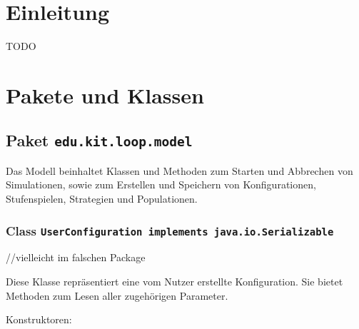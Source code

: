 \documentclass[parskip=full,11pt]{scrartcl}
\begin{document}
\section{Einleitung}
TODO

\section{Pakete und Klassen}
\subsection{Paket \texttt{edu.kit.loop.model}}
Das Modell beinhaltet Klassen und Methoden zum Starten und Abbrechen von Simulationen, sowie zum Erstellen und Speichern von Konfigurationen, Stufenspielen, Strategien und Populationen.

\subsubsection{Class \texttt{UserConfiguration implements java.io.Serializable}}
//vielleicht im falschen Package

Diese Klasse repräsentiert eine vom Nutzer erstellte Konfiguration. Sie bietet Methoden zum Lesen aller zugehörigen Parameter.

Konstruktoren:
\end{document}
